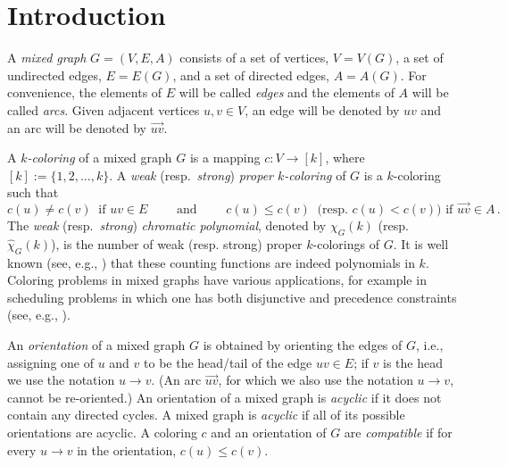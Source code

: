 \documentclass[11pt]{amsart}
\begin{document}
\maketitle


\section{Introduction}
A \emph{mixed graph} $G = (V, E, A)$ consists of a set of vertices, $V=V(G)$, a set of undirected edges, $E=E(G)$, and a set of directed edges, $A=A(G)$. For convenience, the
elements of $E$ will be called \emph{edges} and the elements of $A$ will be called \emph{arcs}. Given adjacent vertices $u,v \in V$, an edge will be denoted by $uv$ and an arc will be denoted by $\vec{uv}$.

A \emph{$k$-coloring} of a mixed graph $G$ is a mapping $c: V \rightarrow [k]$, where $[k] := \{1, 2, \ldots, k\}$. A \emph{weak} (resp.\
\emph{strong}) \emph{proper $k$-coloring} of $G$ is a $k$-coloring such that
\[
  c(u) \neq c(v) \ \text{ if } uv \in E
  \qquad \text{ and } \qquad 
  c(u) \le c(v) \ \text{ (resp. $c(u) < c(v)$) \ if } \vec{uv} \in A \, .
\]
The \emph{weak} (resp.\ \emph{strong}) \emph{chromatic polynomial}, denoted by $\chi_G(k)$ (resp.\ $\widehat{\chi}_G(k)$), is
the number of weak (resp. strong) proper $k$-colorings of $G$. It is well known (see, e.g.,
\cite{kotekmakowskyzilber,sotskovtanaev}) that these counting functions are indeed polynomials in $k$.
Coloring problems in mixed graphs have various applications, for example in scheduling problems in which one has both
disjunctive and precedence constraints (see, e.g., \cite{furmanczykkosowkiries,hansenkuplinskydewerra,Polyproof}).

An \emph{orientation} of a mixed graph $G$ is obtained by orienting the edges of $G$, i.e., assigning one of $u$ and $v$ to be the head/tail of the edge $uv \in E$; if $v$ is the head we use
the notation $u \to v$.
(An arc $\vec{uv}$, for which we also use the notation $u \rightarrow v$, cannot be re-oriented.)
An orientation of a mixed graph is \emph{acyclic} if it does not contain any directed cycles. A mixed graph is \emph{acyclic} if all of its
possible orientations are acyclic. A coloring $c$ and an orientation of $G$ are \emph{compatible} if for every $u \to v$ in the orientation, $c(u) \le c(v)$.
\end{document}

